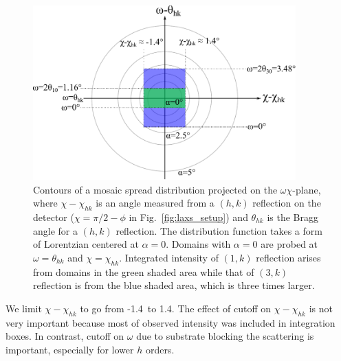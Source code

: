 \begin{figure}[htbp]
  \centering
  \includegraphics[width=0.9\textwidth]{figures/ripple/analysis/mosaic_contour}
  \caption{Contours of a mosaic spread distribution projected on the $\omega\chi$-plane,
  where $\chi-\chi_{hk}$ is an angle measured from a $(h,k)$ reflection on the detector
  ($\chi=\pi/2-\phi$ in Fig.~\ref{fig:laxs_setup}) and $\theta_{hk}$ is the
  Bragg angle for a $(h,k)$ reflection.
  The distribution function takes a form of Lorentzian centered at $\alpha=0$.
  Domains with $\alpha=0$ are probed at $\omega=\theta_{hk}$ and $\chi=\chi_{hk}$.
  Integrated intensity of $(1,k)$ reflection arises from domains in the green
  shaded area while that of $(3,k)$ reflection is from the
  blue shaded area, which is three times larger.}
  \label{fig:mosaic_contour} 
\end{figure}

We limit 
$\chi-\chi_{hk}$ to go from -1.4\textdegree\ to 1.4\textdegree. 
The effect of cutoff on $\chi-\chi_{hk}$ is not very important
because most of observed intensity was included in integration boxes.
In contrast, cutoff on $\omega$ due to substrate blocking the scattering
is important, especially for lower $h$ orders.
 
